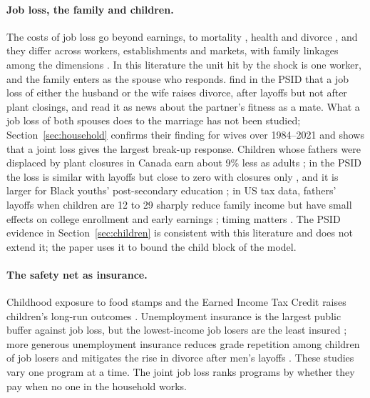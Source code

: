 \paragraph{Job loss, the family and children.} The costs of job loss go beyond earnings, to mortality
\citep{sullivan2009job}, health \citep{black2015losing} and divorce \citep{charles2004job, eliason2012lost}, and they
differ across workers, establishments and markets, with family linkages among the dimensions
\citep{halla2020job, athey2026heterogeneous}. In this literature the unit hit by the shock is one worker, and the
family enters as the spouse who responds. \citet{charles2004job} find in the PSID that a job loss of either the
husband or the wife raises divorce, after layoffs but not after plant closings, and read it as news about the
partner's fitness as a mate. What a job loss of both spouses does to the marriage has not been studied;
Section~\ref{sec:household} confirms their finding for wives over 1984--2021 and shows that a joint loss gives the
largest break-up response. Children whose fathers were displaced by plant closures in Canada earn about 9\% less as adults
\citep{oreopoulos2008intergenerational}; in the PSID the loss is similar with layoffs but close to zero with closures
only \citep{page2009parental}, and it is larger for Black youths' post-secondary education \citep{kalil2011parental}; in
US tax data, fathers' layoffs when children are 12 to 29 sharply reduce family income but have small effects on college
enrollment and early earnings \citep{hilger2016parental}; timing matters \citep{carneiro2022timing}. The PSID evidence in
Section~\ref{sec:children} is consistent with this literature and does not extend it; the paper uses it to bound the
child block of the model.

\paragraph{The safety net as insurance.} Childhood exposure to food stamps and the Earned Income Tax Credit raises
children's long-run outcomes \citep{hoynes2016long, bastian2018long, bailey2024social}. Unemployment insurance is the
largest public buffer against job loss, but the lowest-income job losers are the least insured \citep{east2020how};
more generous unemployment insurance reduces grade repetition among children of job losers \citep{regmi2018examining}
and mitigates the rise in divorce after men's layoffs \citep{lindo2025stable}. These studies vary one program at a time.
The joint job loss ranks programs by whether they pay when no one in the household works.

